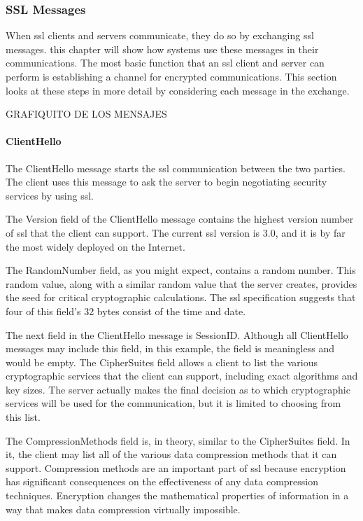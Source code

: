 \subsubsection{SSL Messages}
When ssl clients and servers communicate, they do so by exchanging ssl messages. 
this chapter will show how systems use these messages in their communications.
The most basic function that an ssl client and server can perform is
establishing a channel for encrypted communications. 
This section looks at these steps
in more detail by considering each message in the exchange.


GRAFIQUITO DE LOS MENSAJES 

\paragraph{ClientHello}
The ClientHello message starts the ssl communication between the
two parties. The client uses this message to ask the server to begin
negotiating security services by using ssl. 

The Version field of the ClientHello message contains the highest
version number of ssl that the client can support. The current ssl
version is 3.0, and it is by far the most widely deployed on the Internet. 

The RandomNumber field, as you might expect, contains a random
number. This random value, along with a similar random value that
the server creates, provides the seed for critical cryptographic calculations.
  The ssl specification suggests that
four of this field’s 32 bytes consist of the time and date. 

The next field in the ClientHello message is SessionID. Although all
ClientHello messages may include this field, in this example, the
field is meaningless and would be empty. 
The CipherSuites field allows a client to list the various cryptographic
services that the client can support, including exact algorithms and
key sizes. The server actually makes the final decision as to which
cryptographic services will be used for the communication, but it is
limited to choosing from this list. 

The CompressionMethods field is, in theory, similar to the CipherSuites field.
 In it, the client may list all of the various data compression methods that 
 it can support. Compression methods are an
important part of ssl because encryption has significant consequences on the 
effectiveness of any data compression techniques. Encryption changes the 
mathematical properties of information in a
way that makes data compression virtually impossible. 

